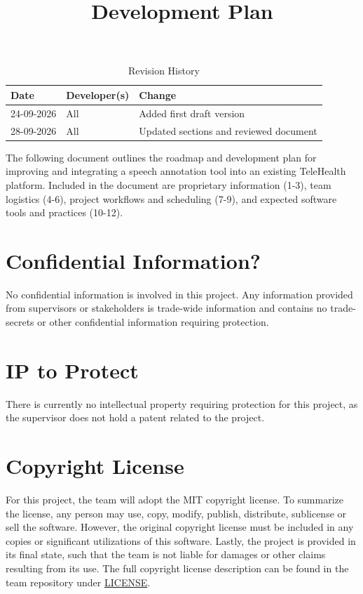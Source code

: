 \documentclass{article}
\title{Development Plan\\\progname}
\author{\authname}
\date{}
\begin{document}
\maketitle

\begin{table}[hp]
\caption{Revision History} \label{TblRevisionHistory}
\begin{tabularx}{\textwidth}{llX}
\toprule
\textbf{Date} & \textbf{Developer(s)} & \textbf{Change}\\
\midrule
24-09-2026 & All & Added first draft version\\
28-09-2026 & All & Updated sections and reviewed document\\
\bottomrule
\end{tabularx}
\end{table}

\newpage{}

The following document outlines the roadmap and development plan for improving and integrating a speech annotation tool into an existing TeleHealth platform. 
Included in the document are proprietary information (1-3), team logistics (4-6), project workflows and scheduling (7-9), and expected software tools and practices (10-12).

\section{Confidential Information?}

No confidential information is involved in this project. Any information provided from supervisors 
or stakeholders is trade-wide information and contains no trade-secrets or other confidential 
information requiring protection.

\section{IP to Protect}
There is currently no intellectual property requiring protection for this project, 
as the supervisor does not hold a patent related to the project.  


\section{Copyright License}

For this project, the team will adopt the MIT copyright license. 
To summarize the license, any person may use, copy, modify, publish, distribute,
 sublicense or sell the software. However, the original copyright license must 
 be included in any copies or significant utilizations of this software. 
 Lastly, the project is provided in its final state, such that the team is not 
 liable for damages or other claims resulting from its use. 
 The full copyright license description can be found in the team repository under \href{https://github.com/Nour-Fawaz/MacaBoca/blob/ea1942dbcb88d9c6d57a5248a4e119ae4c982a19/LICENSE}{LICENSE}.
\end{document}
